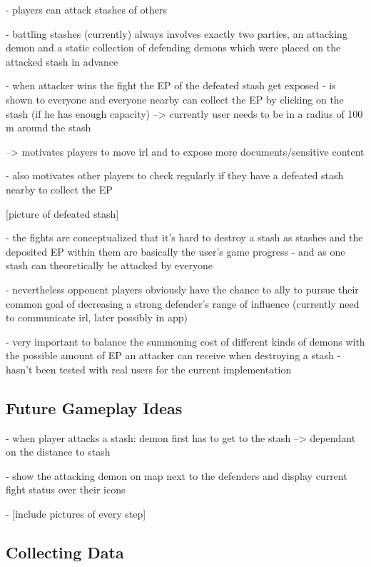 - players can attack stashes of others

- battling stashes (currently) always involves exactly two parties, an attacking demon and a static collection of defending demons which were placed on the attacked stash in advance

- when attacker wins the fight the EP of the defeated stash get exposed 
- is shown to everyone and everyone nearby can collect the EP by clicking on the stash (if he has enough capacity) --> currently user needs to be in a radius of 100 m around the stash 

--> motivates players to move irl and to expose more documents/sensitive content

- also motivates other players to check regularly if they have a defeated stash nearby to collect the EP

[picture of defeated stash]

- the fights are conceptualized that it's hard to destroy a stash as stashes and the deposited EP within them are basically the user's game progress
- and as one stash can theoretically be attacked by everyone

- nevertheless opponent players obviously have the chance to ally to pursue their common goal of decreasing a strong defender's range of influence (currently need to communicate irl, later possibly in app)

- very important to balance the summoning cost of different kinds of demons with the possible amount of EP an attacker can receive when destroying a stash
- hasn't been tested with real users for the current implementation

\subsection{Future Gameplay Ideas}
\label{subsec:futuregameplayideas}

- when player attacks a stash: demon first has to get to the stash --> dependant on the distance to stash 

- show the attacking demon on map next to the defenders and display current fight status over their icons


- [include pictures of every step]

\subsection{Collecting Data}
\label{subsec:collectingdata}

